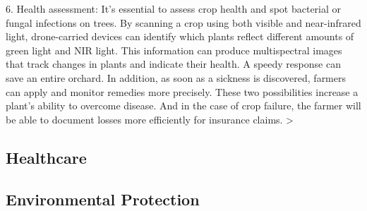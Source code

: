 6. Health assessment: 
It’s essential to assess crop health and 
spot bacterial or fungal infections on trees. 
By scanning a crop using both visible and near-infrared light, 
drone-carried devices can identify 
which plants reflect different amounts of green light and NIR light. 
This information can produce multispectral images 
that track changes in plants and indicate their health. 
A speedy response can save an entire orchard. 
In addition, as soon as a sickness is discovered, 
farmers can apply and monitor remedies more precisely. 
These two possibilities increase a plant’s ability to overcome disease. 
And in the case of crop failure, 
the farmer will be able to document losses more efficiently for insurance claims.
>



\subsection{Healthcare}



\subsection{Environmental Protection}


